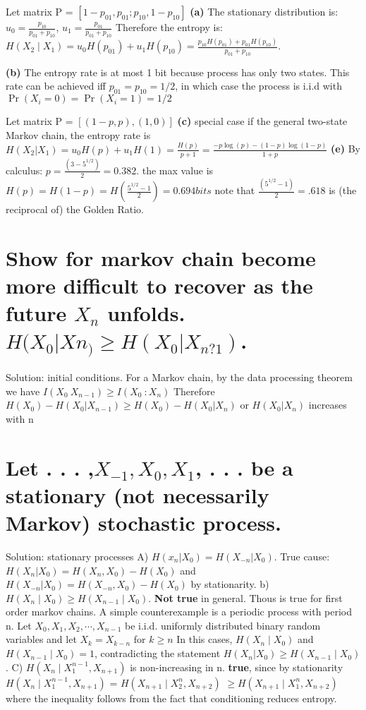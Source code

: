 \documentclass[10pt]{article}
\begin{document}
\begin{tiny}
\begin{multicols}{3}
Let matrix P = $[ 1-p_{01} ,  p_{01}; p_{10}, 1-p_{10}]$ 
\textbf{(a)} The stationary distribution is: $u_0=\frac{p_{10}}{p_{01}+p_{10}}$, $u_1=\frac{p_{01}}{p_{01}+p_{10}}$
Therefore the entropy is: \( H(X_2 \mid X_1) = u_0H(p_{01})+u_1H(p_{10}) = \frac{p_{10}H(p_{01})+ p_{01}H(p_{10})}{p_{01}+p_{10}}. \)

\textbf{(b)} The entropy rate is at most 1 bit because process has only two states. This rate can be achieved iff \(p_{01}=p_{10}=1/2 \), in which case the process is i.i.d with \( \Pr(X_i = 0) =\Pr(X_i=1) = 1/2 \)

Let matrix P = $[ (1-p, p), (1, 0)]$ 
\textbf{(c)} special case if the general two-state Markov chain, the entropy rate is \( H(X_2 | X_1)=u_0H(p)+u_1H(1)=\frac{H(p)}{p+1} = \frac{-p\log(p)-(1-p)\log(1-p)}{1+p} \)
\textbf{(e)} By calculus: \( p=\frac{(3-5^{1/2})}{2}=0.382.\) the max value is \(H(p)=H(1-p)=H(\frac{5^{1/2}-1}{2}) = 0.694bits\)
note that \( \frac{(5^{1/2}-1)}{2} =.618\) is (the reciprocal of) the Golden Ratio.

\section*{Show for markov chain become more difficult to recover as the future $X_n$ unfolds. $H (X_0|Xn_) \ge H (X_0|X_{n?1})$.}
Solution: initial conditions. For a Markov chain, by the data processing theorem we have $I(X_0  \: X_{n-1}) \ge I(X_0 \ : X_n)$ Therefore $H(X_0) - H(X_0 | X_{n-1}) \ge H(X_0) - H(X_0 | X_n)$ or $H(X_0 | X_n)$  increases with n

\section*{Let	. . . ,$ X_{-1}, X_0, X_1$, . . . be	a stationary (not necessarily Markov) stochastic process.}
Solution: stationary processes A) $H(x_n | X_0) = H(X_{-n} | X_0).$ True cause: $H(X_n | X_0) = H(X_n,X_0) - H(X_0)$ and $H(X_{-n} | X_0) = H(X_{-n},X_0) - H(X_0)$ by stationarity.
b) \(H(X_n\mid X_0) \ge H(X_{n-1} \mid X_0). \) \textbf{Not true} in general. Thous is true for first order markov chains. A simple counterexample is a periodic process with period n. Let $X_0,X_1,X_2,\cdots,X_{n-1}$ be i.i.d. uniformly distributed binary random variables and let \(X_k =X_{k-n}\) for \( k \ge n \) In this cases, $H(X_n \mid X_0)$ and $H(X_{n-1} \mid X_0) = 1$, contradicting the statement $H(X_n | X_0) \ge H(X_{n-1} \mid X_0)$. C) \(H(X_n \mid X_1^{n-1}, X_{n+1}) \) is non-increasing in n. \textbf{true}, since by stationarity \(H(X_n \mid X_1^{n-1}, X_{n+1}) \) = \(H(X_{n+1} \mid X_2^{n}, X_{n+2}) \)  \( \ge H(X_{n+1} \mid X_1^{n}, X_{n+2}) \) where the inequality follows from the fact that conditioning reduces entropy.



\end{multicols}
\end{tiny}
\end{document}
